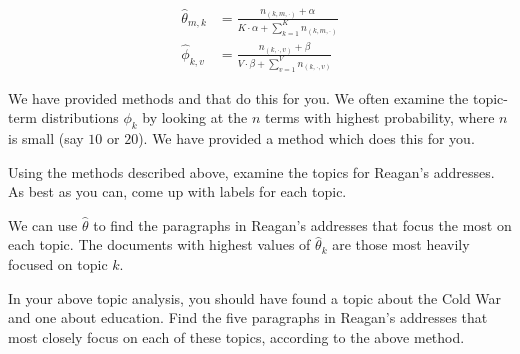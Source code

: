 \begin{align*}
\widehat{\theta}_{m,k} & = \frac{n_{(k,m,\cdot)} + \alpha}{K \cdot \alpha + \sum_{k=1}^{K} n_{(k,m,\cdot)}} \\
\widehat{\phi}_{k,v} & = \frac{n_{(k,\cdot,v)} + \beta}{V \cdot \beta + \sum_{v=1}^{V} n_{(k,\cdot,v)}}
\end{align*}

We have provided methods  and  that do this for you. We often examine the topic-term distributions $\phi_{k}$ by looking at the $n$ terms with highest probability, where $n$ is small (say $10$ or $20$).  We have provided a method  which does this for you.

\begin{problem}
Using the methods described above, examine the topics for Reagan's addresses. As best as you can, come up with labels for each topic.
\end{problem}

We can use $\widehat{\theta}$ to find the paragraphs in Reagan's addresses that focus the most on each topic. The documents with highest values of $\widehat{\theta}_{k}$ are those most heavily focused on topic $k$.

\begin{problem}
In your above topic analysis, you should have found a topic about the Cold War and one about education. Find the five paragraphs in Reagan's addresses that most closely focus on each of these topics, according to the above method.
\end{problem}